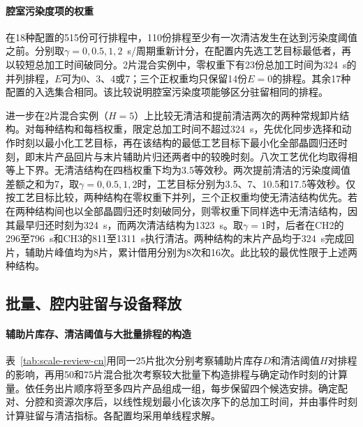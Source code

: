 \documentclass[preprint,12pt,nonatbib]{elsarticle}
\begin{document}
\paragraph{腔室污染度项的权重}
在18种配置的515份可行排程中，110份排程至少有一次清洁发生在达到污染度阈值之前。分别取$\gamma=0,0.5,1,2$~s/周期重新计分，在配置内先选工艺目标最低者，再以较短总加工时间破同分。2片混合实例中，零权重下有23份总加工时间为324~s的并列排程，$E$可为0、3、4或7；三个正权重均只保留14份$E=0$的排程。其余17种配置的入选集合相同。该比较说明腔室污染度项能够区分驻留相同的排程。

进一步在2片混合实例（$H=5$）上比较无清洁和提前清洁两次的两种常规卸片结构。对每种结构和每档权重，限定总加工时间不超过324~s，先优化同步选择和动作时刻以最小化工艺目标，再在该结构的最低工艺目标下最小化全部晶圆归还时刻，即末片产品回片与末片辅助片归还两者中的较晚时刻。八次工艺优化均取得相等上下界。无清洁结构在四档权重下均为3.5等效秒。两次提前清洁的污染度阈值差额之和为7，取$\gamma=0,0.5,1,2$时，工艺目标分别为3.5、7、10.5和17.5等效秒。仅按工艺目标比较，两种结构在零权重下并列，三个正权重均使无清洁结构优先。若在两种结构间也以全部晶圆归还时刻破同分，则零权重下同样选中无清洁结构，因其最早归还时刻为324~s，而两次清洁结构为1323~s。取$\gamma=1$时，后者在CH2的296至796~s和CH3的811至1311~s执行清洁。两种结构的末片产品均于324~s完成回片，辅助片峰值均为8片，累计借用分别为8次和16次。此比较的最优性限于上述两种结构。

\FloatBarrier

\subsection{批量、腔内驻留与设备释放}
\label{sec:coverage-scale-cn}

\paragraph{辅助片库存、清洁阈值与大批量排程的构造}
表~\ref{tab:scale-review-cn}用同一25片批次分别考察辅助片库存$D$和清洁阈值$H$对排程的影响，再用50和75片混合批次考察较大批量下构造排程与确定动作时刻的计算量。依任务出片顺序将至多四片产品组成一组，每步保留四个候选安排。确定配对、分腔和资源次序后，以线性规划最小化该次序下的总加工时间，并由事件时刻计算驻留与清洁指标。各配置均采用单线程求解。
\end{document}
